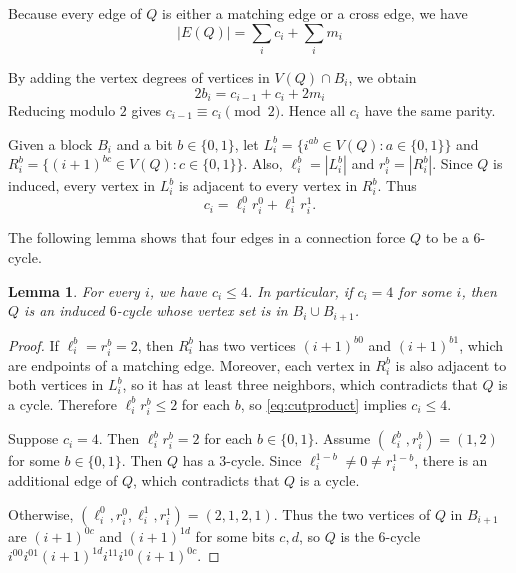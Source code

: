 \documentclass[11pt]{article}
\newtheorem{lemma}[theorem]{Lemma}
\theoremstyle{definition}
\theoremstyle{remark}
\begin{document}
Because every edge of $Q$ is either a matching edge or a cross edge, we have 
\begin{equation}
  |E(Q)|=\sum_i c_i+\sum_i m_i
  \label{eq:lengthcount}
\end{equation}

By adding the vertex degrees of vertices in $V(Q)\cap B_i$, we obtain 
\begin{equation}
  2b_i=c_{i-1}+c_i+2m_i
  \label{eq:degreecount}
\end{equation}
Reducing modulo $2$ gives $c_{i-1}\equiv c_i\pmod2$.
Hence all $c_i$ have the same parity.  

Given a block $B_i$ and a bit $b\in\{0,1\}$, let
$L_i^b=\{i^{ab}\in V(Q):a\in\{0,1\}\}$ and $R_i^b=\{(i+1)^{bc}\in V(Q):c\in\{0,1\}\}$.
Also, $\ell_i^b=|L_i^b|$ and $r_i^b=|R_i^b|$. 
Since $Q$ is induced, every vertex in $L_i^b$ is adjacent to every vertex in $R_i^b$. 
Thus
\begin{equation}
  c_i=\ell_i^0r_i^0+\ell_i^1r_i^1.
  \label{eq:cutproduct}
\end{equation}

The following lemma shows that four edges in a connection force $Q$ to be a 6-cycle. 

\begin{lemma}\label{lem:fourcut}
For every $i$, we have $c_i\le4$. 
In particular, if $c_i=4$ for some $i$, then $Q$ is an induced $6$-cycle whose vertex set is in $B_i\cup B_{i+1}$.
\end{lemma}

\begin{proof}
If $\ell_i^b=r_i^b=2$, then $R_i^b$ has two vertices $(i+1)^{b0}$ and $(i+1)^{b1}$, which are endpoints of a matching edge.  
Moreover, each vertex in $R_i^b$ is also adjacent to both  vertices in $L_i^b$, so it has at least three neighbors, which contradicts that $Q$ is a cycle.
Therefore $\ell_i^br_i^b\le2$ for each $b$, so \eqref{eq:cutproduct} implies $c_i\le4$.

Suppose $c_i=4$.
Then $\ell_i^br_i^b=2$ for each $b\in\{0,1\}$. 
Assume  $(\ell_i^b, r_i^b)=(1,2)$ for some $b\in\{0,1\}$.
Then $Q$ has a $3$-cycle. 
Since $\ell_i^{1-b}\neq0\neq r_i^{1-b}$, there is an additional edge of $Q$, which contradicts that $Q$ is a cycle.  

Otherwise, $(\ell_i^0, r_i^0, \ell_i^1, r_i^1)=(2,1,2,1)$.
Thus the two vertices of $Q$ in $B_{i+1}$ are $(i+1)^{0c}$ and $(i+1)^{1d}$ for some bits $c, d$, so $Q$ is the $6$-cycle $i^{00}i^{01}(i+1)^{1d}i^{11}i^{10}(i+1)^{0c}$.
\end{proof}
\end{document}

